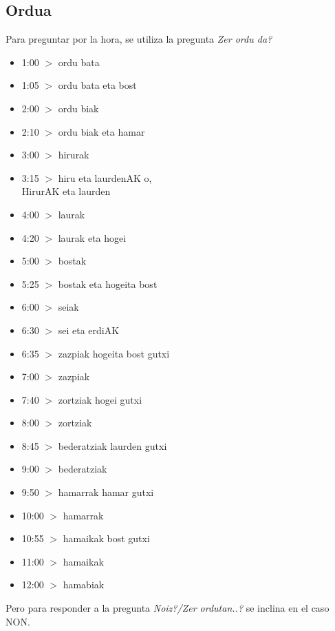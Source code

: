 \documentclass[11pt, a4paper]{article}
\begin{document}
\subsection{Ordua}
Para preguntar por la hora, se utiliza la pregunta \textit{Zer ordu da?}
\begin{multicols}{2}
\begin{itemize}
\item 1:00 $>$ ordu bata
\item 1:05 $>$ ordu bata eta bost
\item 2:00 $>$ ordu biak
\item 2:10 $>$ ordu biak eta hamar
\item 3:00 $>$ hirurak
\item 3:15 $>$ hiru eta laurdenAK o,\\
\indent\indent\indent HirurAK eta laurden
\item 4:00 $>$ laurak
\item 4:20 $>$ laurak eta hogei
\item 5:00 $>$ bostak
\item 5:25 $>$ bostak eta hogeita bost
\item 6:00 $>$ seiak
\item 6:30 $>$ sei eta erdiAK
\item 6:35 $>$ zazpiak hogeita bost gutxi
\item 7:00 $>$ zazpiak
\item 7:40 $>$ zortziak hogei gutxi
\item 8:00 $>$ zortziak
\item 8:45 $>$ bederatziak laurden gutxi
\item 9:00 $>$ bederatziak
\item 9:50 $>$ hamarrak hamar gutxi
\item 10:00 $>$ hamarrak
\item 10:55 $>$ hamaikak bost gutxi
\item 11:00 $>$ hamaikak
\item 12:00 $>$ hamabiak
\end{itemize}
\end{multicols}
\noindent Pero para responder a la pregunta \textit{Noiz?/Zer ordutan..?} se inclina en el caso NON.
\end{document}
